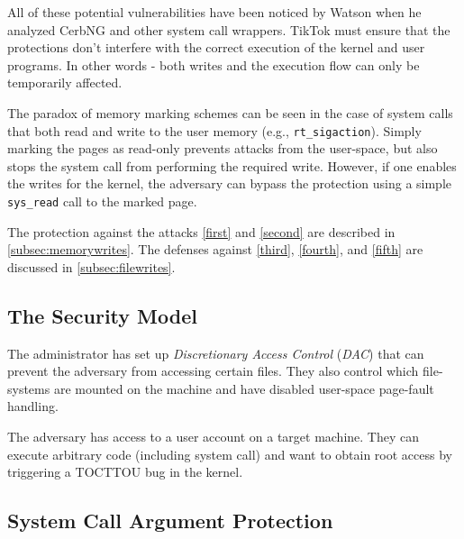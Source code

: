 All of these potential vulnerabilities have been noticed by Watson when he
analyzed CerbNG\cite{watson2007exploiting} and other system call wrappers.
TikTok must ensure that the protections don't interfere with the correct
execution of the kernel and user programs. In other words - both writes and the
execution flow can only be temporarily affected.

The paradox of memory marking schemes can be seen in the case of system calls
that both read and write to the user memory (e.g., \texttt{rt\_sigaction}).
Simply marking the pages as read-only prevents attacks from the user-space, but
also stops the system call from performing the required write. However, if one
enables the writes for the kernel, the adversary can bypass the protection
using a simple \texttt{sys\_read} call to the marked page.

The protection against the attacks \ref{first} and \ref{second} are described in
\cref{subsec:memorywrites}. The defenses against \ref{third}, \ref{fourth}, and
\ref{fifth} are discussed in \cref{subsec:filewrites}.


\subsection{The Security Model}
\label{subsec:secmodel}
The administrator has set up \emph{Discretionary Access Control} (\emph{DAC})
that can prevent the adversary from accessing certain files. They also control
which file-systems are mounted on the machine and have disabled user-space
page-fault handling. 

The adversary has access to a user account on a target machine. They can execute
arbitrary code (including system call) and want to obtain root access by 
triggering a TOCTTOU bug in the kernel.

\subsection{System Call Argument Protection}

